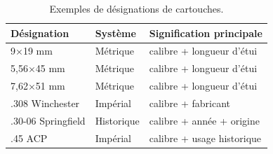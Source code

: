 \begin{table}[htbp]
\centering
\caption{Exemples de désignations de cartouches.}
\label{tab:designations}

\begin{tabular}{lll}
\hline
Désignation & Système & Signification principale \\
\hline
9×19 mm & Métrique & calibre + longueur d'étui \\
5,56×45 mm & Métrique & calibre + longueur d'étui \\
7,62×51 mm & Métrique & calibre + longueur d'étui \\
.308 Winchester & Impérial & calibre + fabricant \\
.30-06 Springfield & Historique & calibre + année + origine \\
.45 ACP & Impérial & calibre + usage historique \\
\hline
\end{tabular}

\end{table}
